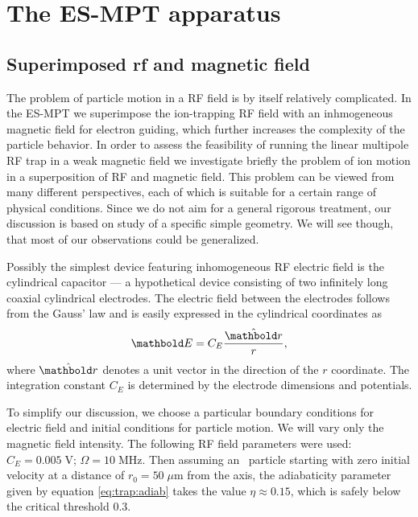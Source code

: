 
\chapter{The ES-MPT apparatus}

\label{ch:ESMPT}

\section{Superimposed rf and magnetic field}
The problem of particle motion in a \ac{RF} field is by itself
relatively complicated. In the \ac{ES-MPT} we superimpose
the ion-trapping \ac{RF} field with an inhmogeneous magnetic
field for electron guiding, which further increases the complexity
of the particle behavior. In order to assess the feasibility of
running the linear multipole \ac{RF} trap in a weak magnetic field
we investigate briefly the problem of ion motion in a superposition
of \ac{RF} and magnetic field. This problem can be viewed from
many different perspectives, each of which is suitable for
a certain range of physical conditions. Since we do not aim for a
general rigorous treatment, our discussion is based on study
of a specific simple geometry. We will see though, that most
of our observations could be generalized.

Possibly the simplest device featuring inhomogeneous RF electric
field is the cylindrical capacitor --- a hypothetical device
consisting of two infinitely long coaxial cylindrical electrodes.
The electric field between the electrodes follows from the Gauss' law
and is easily expressed in the cylindrical coordinates as
\begin{equation}
\mb E = C_E\frac{\hat {\mb r}}{r},
\label{eq:esmpt:magnetronfield}
\end{equation}
where $\hat{\mb r}$ denotes a unit vector in the direction of the $r$
coordinate. The integration constant $C_E$ is determined by the
electrode dimensions and potentials.

To simplify our discussion, we choose a particular
boundary conditions for electric field and initial conditions
for particle motion. We will vary only the magnetic field
intensity. The following \ac{RF} field
parameters were used:
$C_E = 0.005\;\text{V}$; $\Omega=10\;\text{MHz}$.
Then assuming an \Hminus\ particle starting with zero
initial velocity at a distance of $r_0=50\;\mu\text{m}$ from the
axis, the adiabaticity parameter given by equation
\eqref{eq:trap:adiab} takes the value $\eta\approx 0.15$, which
is safely below the critical threshold $0.3$.

